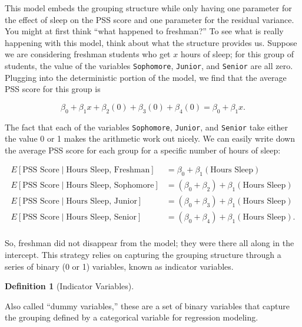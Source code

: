 \documentclass[
  letterpaper,
  DIV=11,
  numbers=noendperiod]{scrreprt}
\theoremstyle{definition}
\newtheorem{definition}{Definition}[chapter]
\theoremstyle{definition}
\theoremstyle{remark}
\begin{document}
This model embeds the grouping structure while only having one parameter
for the effect of sleep on the PSS score and one parameter for the
residual variance. You might at first think ``what happened to
freshman?'' To see what is really happening with this model, think about
what the structure provides us. Suppose we are considering freshman
students who get \(x\) hours of sleep; for this group of students, the
value of the variables \texttt{Sophomore}, \texttt{Junior}, and
\texttt{Senior} are all zero. Plugging into the deterministic portion of
the model, we find that the average PSS score for this group is

\[\beta_0 + \beta_1 x + \beta_2 (0) + \beta_3 (0) + \beta_4 (0) = \beta_0 + \beta_1 x.\]

The fact that each of the variables \texttt{Sophomore}, \texttt{Junior},
and \texttt{Senior} take either the value 0 or 1 makes the arithmetic
work out nicely. We can easily write down the average PSS score for each
group for a specific number of hours of sleep:

\[
\begin{aligned}
  E\left[\text{PSS Score} \mid \text{Hours Sleep, Freshman}\right]
    &= \beta_0 + \beta_1 (\text{Hours Sleep}) \\
  E\left[\text{PSS Score} \mid \text{Hours Sleep, Sophomore}\right]
    &= \left(\beta_0 + \beta_2\right) + \beta_1 (\text{Hours Sleep})\\
  E\left[\text{PSS Score} \mid \text{Hours Sleep, Junior}\right]
    &= \left(\beta_0 + \beta_3\right) + \beta_1 (\text{Hours Sleep}) \\
  E\left[\text{PSS Score} \mid \text{Hours Sleep, Senior}\right]
    &= \left(\beta_0 + \beta_4\right) + \beta_1 (\text{Hours Sleep}). \\
\end{aligned}
\]

So, freshman did not disappear from the model; they were there all along
in the intercept. This strategy relies on capturing the grouping
structure through a series of binary (0 or 1) variables, known as
indicator variables.

\begin{definition}[Indicator
Variables]\protect\hypertarget{def-indicator-variables}{}\label{def-indicator-variables}

Also called ``dummy variables,'' these are a set of binary variables
that capture the grouping defined by a categorical variable for
regression modeling.

\end{definition}
\end{document}
